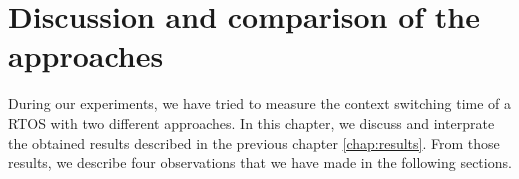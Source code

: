 \chapter{Discussion and comparison of the approaches\label{chap:discuss}}

During our experiments, we have tried to measure the context switching time of a RTOS with two different approaches.
In this chapter, we discuss and interprate the obtained results described in the previous chapter \ref{chap:results}.
From those results, we describe four observations that we have made in the following sections.





